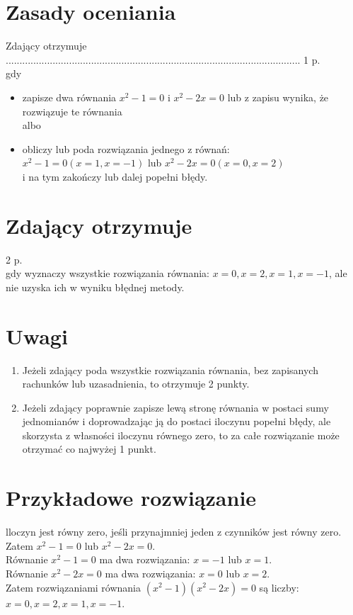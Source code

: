 \documentclass[10pt]{article}
\begin{document}
\section*{Zasady oceniania}
Zdający otrzymuje ........................................................................................................... 1 p.\\
gdy

\begin{itemize}
  \item zapisze dwa równania $x^{2}-1=0$ i $x^{2}-2 x=0$ lub z zapisu wynika, że rozwiązuje te równania\\
albo
  \item obliczy lub poda rozwiązania jednego z równań:\\
$x^{2}-1=0(x=1, x=-1)$ lub $x^{2}-2 x=0(x=0, x=2)$\\
i na tym zakończy lub dalej popełni błędy.
\end{itemize}

\section*{Zdający otrzymuje}
2 p.\\
gdy wyznaczy wszystkie rozwiązania równania: $x=0, x=2, x=1, x=-1$, ale nie uzyska ich w wyniku błędnej metody.

\section*{Uwagi}
\begin{enumerate}
  \item Jeżeli zdający poda wszystkie rozwiązania równania, bez zapisanych rachunków lub uzasadnienia, to otrzymuje 2 punkty.
  \item Jeżeli zdający poprawnie zapisze lewą stronę równania w postaci sumy jednomianów i doprowadzając ją do postaci iloczynu popełni błędy, ale skorzysta z własności iloczynu równego zero, to za całe rozwiązanie może otrzymać co najwyżej 1 punkt.
\end{enumerate}

\section*{Przykładowe rozwiązanie}
lloczyn jest równy zero, jeśli przynajmniej jeden z czynników jest równy zero.\\
Zatem $x^{2}-1=0$ lub $x^{2}-2 x=0$.\\
Równanie $x^{2}-1=0$ ma dwa rozwiązania: $x=-1$ lub $x=1$.\\
Równanie $x^{2}-2 x=0$ ma dwa rozwiązania: $x=0$ lub $x=2$.\\
Zatem rozwiązaniami równania $\left(x^{2}-1\right)\left(x^{2}-2 x\right)=0$ są liczby: $x=0, x=2, x=1, x=-1$.
\end{document}
